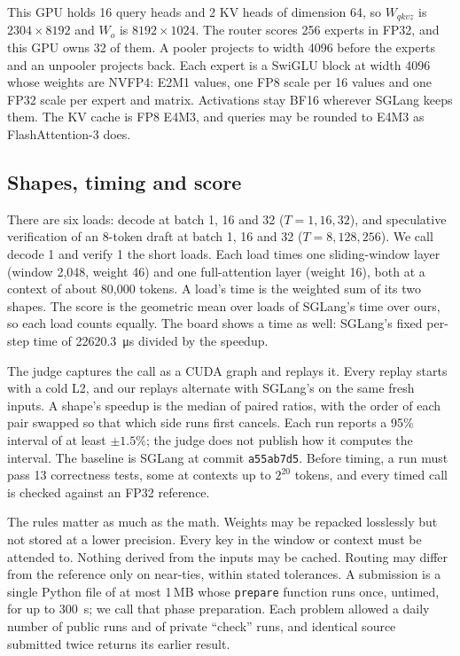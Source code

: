 \documentclass[11pt]{article}
\begin{document}
This GPU holds 16 query heads and 2 KV heads of dimension 64, so $W_{qkvz}$ is
$2304\times8192$ and $W_o$ is $8192\times1024$. The router scores 256 experts in
FP32, and this GPU owns 32 of them. A pooler projects to width 4096 before the
experts and an unpooler projects back. Each expert is a SwiGLU block at width
4096 whose weights are NVFP4: E2M1 values, one FP8 scale per 16 values and one
FP32 scale per expert and matrix. Activations stay BF16 wherever SGLang keeps
them. The KV cache is FP8 E4M3, and queries may be rounded to E4M3 as
FlashAttention-3 does.

\subsection{Shapes, timing and score}

There are six loads: decode at batch 1, 16 and 32 ($T = 1, 16, 32$), and
speculative verification of an 8-token draft at batch 1, 16 and 32
($T = 8, 128, 256$). We call decode 1 and verify 1 the short loads. Each load times
one sliding-window layer (window 2{,}048, weight 46) and one full-attention layer
(weight 16), both at a context of about 80{,}000 tokens. A load's time is the
weighted sum of its two shapes. The score is the geometric mean over loads of
SGLang's time over ours, so each load counts equally. The board shows a time as
well: SGLang's fixed per-step time of \SI{22620.3}{\micro\second} divided by the
speedup.

The judge captures the call as a CUDA graph and replays it. Every replay starts
with a cold L2, and our replays alternate with SGLang's on the same fresh inputs.
A shape's speedup is the median of paired ratios, with the order of each pair
swapped so that which side runs first cancels. Each run reports a 95\% interval of
at least $\pm1.5\%$; the judge does not publish how it computes the interval. The
baseline is SGLang at commit \texttt{a55ab7d5}. Before timing, a run must pass 13
correctness tests, some at contexts up to $2^{20}$ tokens, and every timed call is
checked against an FP32 reference.

The rules matter as much as the math. Weights may be repacked losslessly but not
stored at a lower precision. Every key in the window or context must be attended
to. Nothing derived from the inputs may be cached. Routing may differ from the
reference only on near-ties, within stated tolerances. A submission is a single
Python file of at most 1\,MB whose \texttt{prepare} function runs once, untimed,
for up to \SI{300}{\second}; we call that phase preparation. Each problem allowed a
daily number of public runs and of private ``check'' runs, and identical source
submitted twice returns its earlier result.
\end{document}
